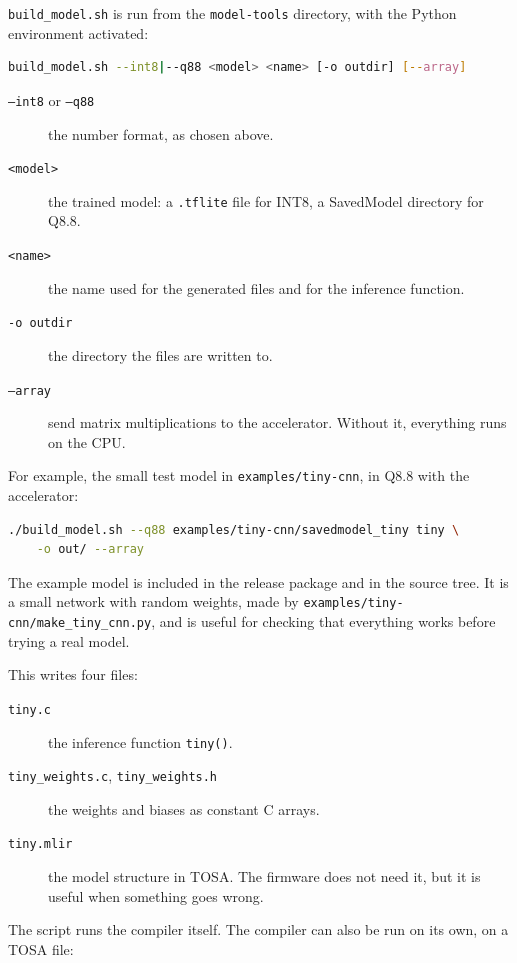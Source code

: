 \documentclass[11pt,a4paper]{article}
\begin{document}
\texttt{build\_model.sh} is run from the \texttt{model-tools} directory, with
the Python environment activated:

\begin{lstlisting}[language=bash]
build_model.sh --int8|--q88 <model> <name> [-o outdir] [--array]
\end{lstlisting}

\begin{description}
  \item[\texttt{--int8} or \texttt{--q88}] the number format, as chosen above.
  \item[\texttt{<model>}] the trained model: a \texttt{.tflite} file for
    INT8, a SavedModel directory for Q8.8.
  \item[\texttt{<name>}] the name used for the generated files and for the
    inference function.
  \item[\texttt{-o outdir}] the directory the files are written to.
  \item[\texttt{--array}] send matrix multiplications to the accelerator.
    Without it, everything runs on the CPU.
\end{description}

For example, the small test model in \texttt{examples/tiny-cnn}, in Q8.8 with
the accelerator:

\begin{lstlisting}[language=bash]
./build_model.sh --q88 examples/tiny-cnn/savedmodel_tiny tiny \
    -o out/ --array
\end{lstlisting}

The example model is included in the release package and in the source tree.
It is a small network with random weights, made by
\texttt{examples/tiny-cnn/make\_tiny\_cnn.py}, and is useful for checking that
everything works before trying a real model.

This writes four files:

\begin{description}
  \item[\texttt{tiny.c}] the inference function \texttt{tiny()}.
  \item[\texttt{tiny\_weights.c}, \texttt{tiny\_weights.h}] the weights and
    biases as constant C arrays.
  \item[\texttt{tiny.mlir}] the model structure in TOSA. The firmware does not
    need it, but it is useful when something goes wrong.
\end{description}

The script runs the compiler itself. The compiler can also be run on its own,
on a TOSA file:
\end{document}
